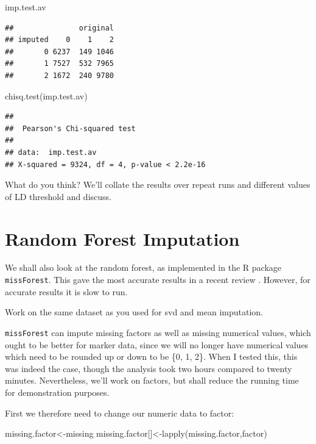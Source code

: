 \documentclass[
]{book}
\newenvironment{Shaded}{\begin{snugshade}}{\end{snugshade}}
\newcommand{\FunctionTok}[1]{\textcolor[rgb]{0.00,0.00,0.00}{#1}}
\newcommand{\NormalTok}[1]{#1}
\newcommand{\OtherTok}[1]{\textcolor[rgb]{0.56,0.35,0.01}{#1}}
\begin{document}
\begin{Shaded}
\begin{Highlighting}[]
\NormalTok{imp.test.av}
\end{Highlighting}
\end{Shaded}

\begin{verbatim}
##               original
## imputed    0    1    2
##       0 6237  149 1046
##       1 7527  532 7965
##       2 1672  240 9780
\end{verbatim}

\begin{Shaded}
\begin{Highlighting}[]
\FunctionTok{chisq.test}\NormalTok{(imp.test.av)}
\end{Highlighting}
\end{Shaded}

\begin{verbatim}
## 
##  Pearson's Chi-squared test
## 
## data:  imp.test.av
## X-squared = 9324, df = 4, p-value < 2.2e-16
\end{verbatim}

What do you think? We'll collate the results over repeat runs and different values of LD threshold and discuss.

\hypertarget{random-forest-imputation}{%
\section{Random Forest Imputation}\label{random-forest-imputation}}

We shall also look at the random forest, as implemented in the R package \texttt{missForest}. This gave the most accurate results in a recent review \citet{Rutkoski_2013}. However, for accurate results it is slow to run.

Work on the same dataset as you used for svd and mean imputation.

\texttt{missForest} can impute missing factors as well as missing numerical values, which ought to be better for marker data, since we will no longer have numerical values which need to be rounded up or down to be \{0, 1, 2\}. When I tested this, this was indeed the case, though the analysis took two hours compared to twenty minutes. Nevertheless, we'll work on factors, but shall reduce the running time for demonstration purposes.

First we therefore need to change our numeric data to factor:

\begin{Shaded}
\begin{Highlighting}[]
\NormalTok{missing.factor}\OtherTok{\textless{}{-}}\NormalTok{missing}
\NormalTok{missing.factor[]}\OtherTok{\textless{}{-}}\FunctionTok{lapply}\NormalTok{(missing.factor,factor)}
\end{Highlighting}
\end{Shaded}
\end{document}

